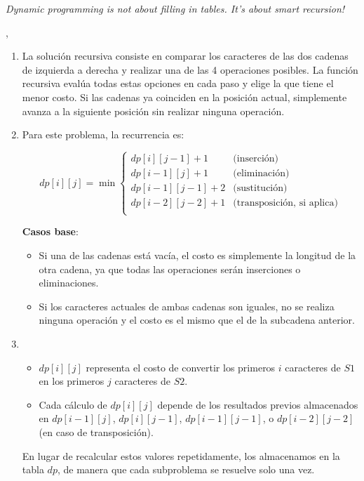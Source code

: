 
\epigraph{\textit{Dynamic programming is not about filling in tables. It's about smart recursion!}}{\citeauthor{algorithms_erickson}, \citeyear{algorithms_erickson} \cite{algorithms_erickson}}

\begin{enumerate}[1)]
    \item La solución recursiva consiste en comparar los caracteres de las dos cadenas de izquierda a derecha y realizar una de las 4 operaciones posibles. La función recursiva evalúa todas estas opciones en cada paso y elige la que tiene el menor costo. Si las cadenas ya coinciden en la posición actual, simplemente avanza a la siguiente posición sin realizar ninguna operación.

    \item Para este problema, la recurrencia es:

\[
dp[i][j] = \min \left\{
\begin{array}{ll}
dp[i][j-1] + 1 & \text{(inserción)} \\
dp[i-1][j] + 1 & \text{(eliminación)} \\
dp[i-1][j-1] + 2 & \text{(sustitución)} \\
dp[i-2][j-2] + 1 & \text{(transposición, si aplica)} \\
\end{array}
\right.
\]

\textbf{Casos base}:
\begin{itemize}
    \item Si una de las cadenas está vacía, el costo es simplemente la longitud de la otra cadena, ya que todas las operaciones serán inserciones o eliminaciones.
    \item Si los caracteres actuales de ambas cadenas son iguales, no se realiza ninguna operación y el costo es el mismo que el de la subcadena anterior.
\end{itemize}

    
\item \begin{itemize}
    \item $dp[i][j]$ representa el costo de convertir los primeros $i$ caracteres de $S1$ en los primeros $j$ caracteres de $S2$.
    \item Cada cálculo de $dp[i][j]$ depende de los resultados previos almacenados en $dp[i-1][j]$, $dp[i][j-1]$, $dp[i-1][j-1]$, o $dp[i-2][j-2]$ (en caso de transposición).
\end{itemize}

En lugar de recalcular estos valores repetidamente, los almacenamos en la tabla $dp$, de manera que cada subproblema se resuelve solo una vez.


\end{enumerate}
